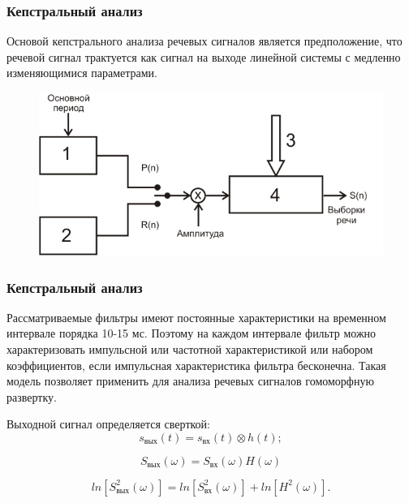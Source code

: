 \documentclass[slidestop, compress, mathserif, blackandwhite, utf8, serif, slidescentered]{beamer}
\begin{document}
\begin{frame}
	\frametitle{Кепстральный анализ}
	Основой кепстрального анализа речевых сигналов является предположение, что речевой сигнал трактуется как сигнал на выходе линейной системы с медленно изменяющимися параметрами.
	\begin{figure}[h]	
	\centering
	\includegraphics[width=.7\textwidth]{../speech_filt.png}			
	\caption{}
	
	\label{speech_filt}
	\end{figure}
\end{frame}

\begin{frame}
	\frametitle{Кепстральный анализ}
	Рассматриваемые фильтры имеют постоянные характеристики на временном интервале порядка 10-15 мс. Поэтому на каждом интервале фильтр можно характеризовать импульсной или частотной характеристикой или набором коэффициентов, если импульсная характеристика фильтра бесконечна. Такая модель позволяет применить для анализа речевых сигналов гомоморфную развертку.

	Выходной сигнал определяется сверткой:
	\begin{equation}
		s_{\text{вых}}(t)=s_{\text{вх}}(t)\otimes h(t);
	\end{equation}
	
	\begin{equation}
		S_{\text{вых}}(\omega)=S_{\text{вх}}(\omega)H(\omega)	
	\end{equation}
	   
	\begin{equation}
		ln[S^2_{\text{вых}}(\omega)]=ln[S^{2}_{\text{вх}}(\omega)]+ln[H^{2}(\omega)].
		\label{eq:unconv1}
	\end{equation}

\end{frame}
\end{document}
